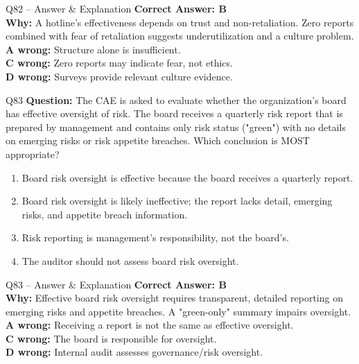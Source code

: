 \documentclass[aspectratio=169,10pt]{beamer}
\begin{document}
	\begin{frame}[t]{Q82 -- Answer \& Explanation}
		\small
		\textbf{Correct Answer: B} \\[4pt]
		\textbf{Why:} A hotline's effectiveness depends on trust and non-retaliation. Zero reports combined with fear of retaliation suggests underutilization and a culture problem. \\[4pt]
		\textbf{A wrong:} Structure alone is insufficient. \\[2pt]
		\textbf{C wrong:} Zero reports may indicate fear, not ethics. \\[2pt]
		\textbf{D wrong:} Surveys provide relevant culture evidence.
	\end{frame}
	
	\begin{frame}[t]{Q83}
		\small
		\textbf{Question:} The CAE is asked to evaluate whether the organization's board has effective oversight of risk. The board receives a quarterly risk report that is prepared by management and contains only risk status ("green") with no details on emerging risks or risk appetite breaches. Which conclusion is MOST appropriate?
		\begin{enumerate}[label=\Alph*.,itemsep=1pt,topsep=2pt]
			\item Board risk oversight is effective because the board receives a quarterly report.
			\item Board risk oversight is likely ineffective; the report lacks detail, emerging risks, and appetite breach information.
			\item Risk reporting is management's responsibility, not the board's.
			\item The auditor should not assess board risk oversight.
		\end{enumerate}
	\end{frame}
	
	\begin{frame}[t]{Q83 -- Answer \& Explanation}
		\small
		\textbf{Correct Answer: B} \\[4pt]
		\textbf{Why:} Effective board risk oversight requires transparent, detailed reporting on emerging risks and appetite breaches. A "green-only" summary impairs oversight. \\[4pt]
		\textbf{A wrong:} Receiving a report is not the same as effective oversight. \\[2pt]
		\textbf{C wrong:} The board is responsible for oversight. \\[2pt]
		\textbf{D wrong:} Internal audit assesses governance/risk oversight.
	\end{frame}
	
\end{document}
